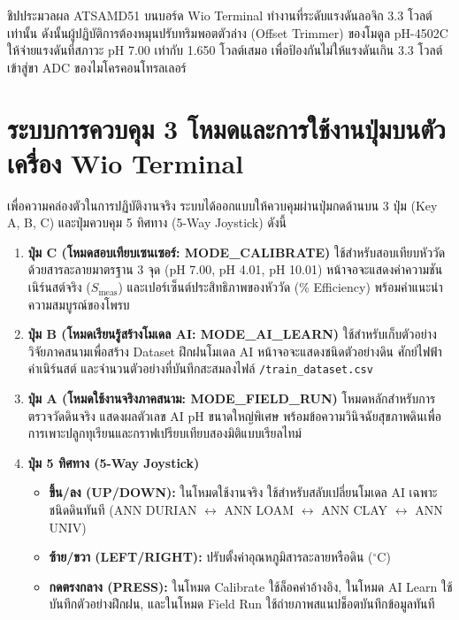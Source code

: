 \documentclass[12pt,a4paper,oneside]{report}
\begin{document}
\begin{tcolorbox}[enhanced, colback=yellow!10, colframe=red!70!black, arc=3mm, title=\textbf{ข้อควรระวังสำคัญด้านความปลอดภัยของแรงดันไฟฟ้า}]
ชิปประมวลผล ATSAMD51 บนบอร์ด Wio Terminal ทำงานที่ระดับแรงดันลอจิก 3.3 โวลต์เท่านั้น ดังนั้นผู้ปฏิบัติการต้องหมุนปรับทริมพอตตัวล่าง (Offset Trimmer) ของโมดูล pH-4502C ให้จ่ายแรงดันที่สภาวะ pH 7.00 เท่ากับ 1.650 โวลต์เสมอ เพื่อป้องกันไม่ให้แรงดันเกิน 3.3 โวลต์เข้าสู่ขา ADC ของไมโครคอนโทรลเลอร์
\end{tcolorbox}

\section{ระบบการควบคุม 3 โหมดและการใช้งานปุ่มบนตัวเครื่อง Wio Terminal}
เพื่อความคล่องตัวในการปฏิบัติงานจริง ระบบได้ออกแบบให้ควบคุมผ่านปุ่มกดด้านบน 3 ปุ่ม (Key A, B, C) และปุ่มควบคุม 5 ทิศทาง (5-Way Joystick) ดังนี้
\begin{enumerate}
    \item \textbf{ปุ่ม C (โหมดสอบเทียบเซนเซอร์: MODE\_CALIBRATE)} ใช้สำหรับสอบเทียบหัววัดด้วยสารละลายมาตรฐาน 3 จุด (pH 7.00, pH 4.01, pH 10.01) หน้าจอจะแสดงค่าความชันเนิร์นสต์จริง ($S_{\text{meas}}$) และเปอร์เซ็นต์ประสิทธิภาพของหัววัด (\% Efficiency) พร้อมคำแนะนำความสมบูรณ์ของโพรบ
    \item \textbf{ปุ่ม B (โหมดเรียนรู้สร้างโมเดล AI: MODE\_AI\_LEARN)} ใช้สำหรับเก็บตัวอย่างวิจัยภาคสนามเพื่อสร้าง Dataset ฝึกฝนโมเดล AI หน้าจอจะแสดงชนิดตัวอย่างดิน ศักย์ไฟฟ้า ค่าเนิร์นสต์ และจำนวนตัวอย่างที่บันทึกสะสมลงไฟล์ \texttt{/train\_dataset.csv}
    \item \textbf{ปุ่ม A (โหมดใช้งานจริงภาคสนาม: MODE\_FIELD\_RUN)} โหมดหลักสำหรับการตรวจวัดดินจริง แสดงผลตัวเลข AI pH ขนาดใหญ่พิเศษ พร้อมข้อความวินิจฉัยสุขภาพดินเพื่อการเพาะปลูกทุเรียนและกราฟเปรียบเทียบสองมิติแบบเรียลไทม์
    \item \textbf{ปุ่ม 5 ทิศทาง (5-Way Joystick)}
    \begin{itemize}
        \item \textbf{ขึ้น/ลง (UP/DOWN):} ในโหมดใช้งานจริง ใช้สำหรับสลับเปลี่ยนโมเดล AI เฉพาะชนิดดินทันที (ANN DURIAN $\leftrightarrow$ ANN LOAM $\leftrightarrow$ ANN CLAY $\leftrightarrow$ ANN UNIV)
        \item \textbf{ซ้าย/ขวา (LEFT/RIGHT):} ปรับตั้งค่าอุณหภูมิสารละลายหรือดิน ($^\circ\text{C}$)
        \item \textbf{กดตรงกลาง (PRESS):} ในโหมด Calibrate ใช้ล็อคค่าอ้างอิง, ในโหมด AI Learn ใช้บันทึกตัวอย่างฝึกฝน, และในโหมด Field Run ใช้ถ่ายภาพสแนปช็อตบันทึกข้อมูลทันที
    \end{itemize}
\end{enumerate}
\end{document}
